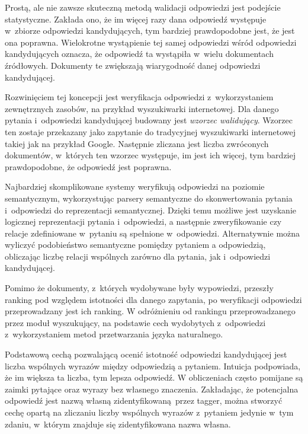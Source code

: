 \documentclass[a4paper, twoside, openright, 12pt]{report}
\begin{document}
            Prostą, ale nie zawsze skuteczną metodą walidacji odpowiedzi jest podejście statystyczne. Zakłada ono, że
            im więcej razy dana odpowiedź występuje w~zbiorze odpowiedzi kandydujących, tym bardziej prawdopodobne
            jest, że jest ona poprawna. Wielokrotne wystąpienie tej samej odpowiedzi wśród odpowiedzi kandydujących
            oznacza, że odpowiedź ta wystąpiła w~wielu dokumentach źródłowych. Dokumenty te zwiększają wiarygodność
            danej odpowiedzi kandydującej.

            Rozwinięciem tej koncepcji jest weryfikacja odpowiedzi z~wykorzystaniem zewnętrznych zasobów, na przykład
            wyszukiwarki internetowej. Dla danego
            pytania i~odpowiedzi kandydującej budowany jest \emph{wzorzec walidujący}. Wzorzec ten zostaje przekazany
            jako zapytanie do tradycyjnej wyszukiwarki internetowej takiej jak na przykład Google. Następnie zliczana
            jest liczba zwróconych dokumentów, w~których ten wzorzec występuje, im jest ich więcej, tym bardziej
            prawdopodobne, że odpowiedź jest poprawna\cite{WEBVERIFICATION}.

            Najbardziej skomplikowane systemy weryfikują odpowiedzi na poziomie semantycznym, wykorzystując parsery
            semantyczne do skonwertowania pytania i~odpowiedzi do reprezentacji semantycznej. Dzięki temu możliwe
            jest uzyskanie logicznej reprezentacji pytania i~odpowiedzi, a następnie zweryfikowanie czy relacje
            zdefiniowane w~pytaniu są spełnione w~odpowiedzi. Alternatywnie można wyliczyć podobieństwo semantyczne
            pomiędzy pytaniem a odpowiedzią, obliczając liczbę relacji wspólnych zarówno dla pytania, jak i~odpowiedzi
            kandydującej\cite{SEMANTICVERIFICATION}.

            Pomimo że dokumenty, z~których wydobywane były wypowiedzi, przeszły ranking pod względem istotności dla danego
            zapytania, po weryfikacji odpowiedzi przeprowadzany jest ich ranking. W odróżnieniu od rankingu przeprowadzanego
            przez moduł wyszukujący, na podstawie cech wydobytych z~odpowiedzi z~wykorzystaniem metod przetwarzania
            języka naturalnego.

            Podstawową cechą pozwalającą ocenić istotność odpowiedzi kandydującej jest liczba wspólnych wyrazów między
            odpowiedzią a pytaniem. Intuicja podpowiada, że im większa ta liczba, tym lepsza odpowiedź. W obliczeniach
            często pomijane są zaimki pytające oraz wyrazy bez własnego znaczenia. Zakładając, że potencjalna odpowiedź
            jest nazwą własną zidentyfikowaną przez tagger, można stworzyć cechę opartą na zliczaniu liczby wspólnych
            wyrazów z~pytaniem jedynie w~tym zdaniu, w~którym znajduje się zidentyfikowana nazwa własna.
\end{document}
